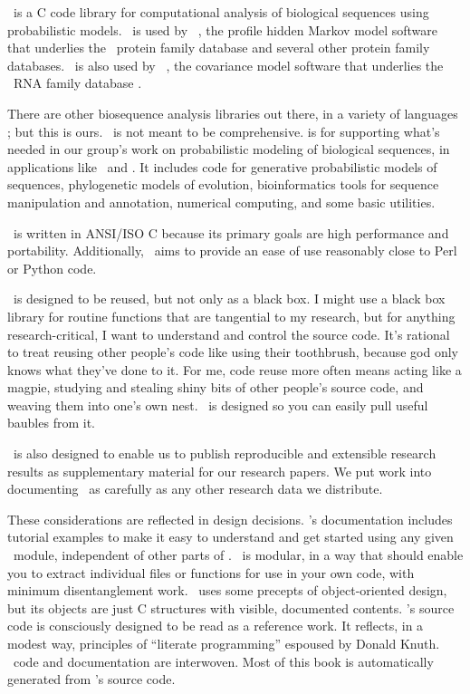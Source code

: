 

\Easel\ is a C code library for computational analysis of biological
sequences using probabilistic models. \Easel\ is used by \HMMER\ 
\citep{hmmer,Eddy98}, the profile hidden Markov model software that
underlies the \Pfam\ protein family database
\citep{Finn06,Sonnhammer97} and several other protein family
databases. \Easel\ is also used by \Infernal\ 
\citep{infernal,NawrockiEddy07}, the covariance model software that
underlies the \Rfam\ RNA family database
\citep{Griffiths-Jones05}. 

There are other biosequence analysis libraries out there, in a variety
of languages
\citep{Vahrson96,Pitt01,Mangalam02,Butt05,Dutheil06,Giancarlo07,Doring08};
but this is ours.  \Easel\ is not meant to be comprehensive.  \Easel
is for supporting what's needed in our group's work on probabilistic
modeling of biological sequences, in applications like \HMMER\ and
\Infernal. It includes code for generative probabilistic models of
sequences, phylogenetic models of evolution, bioinformatics tools for
sequence manipulation and annotation, numerical computing, and some
basic utilities.

\Easel\ is written in ANSI/ISO C because its primary goals are high
performance and portability. Additionally, \Easel\ aims to provide an
ease of use reasonably close to Perl or Python code.

\Easel\ is designed to be reused, but not only as a black box. I might
use a black box library for routine functions that are tangential to
my research, but for anything research-critical, I want to understand
and control the source code.  It's rational to treat reusing other
people's code like using their toothbrush, because god only knows what
they've done to it. For me, code reuse more often means acting like a
magpie, studying and stealing shiny bits of other people's source
code, and weaving them into one's own nest. \Easel\ is designed so you
can easily pull useful baubles from it.

\Easel\ is also designed to enable us to publish reproducible and
extensible research results as supplementary material for our research
papers. We put work into documenting \Easel\ as carefully as any other
research data we distribute.

These considerations are reflected in \Easel design decisions.
\Easel's documentation includes tutorial examples to make it easy to
understand and get started using any given \Easel\ module, independent
of other parts of \Easel.  \Easel\ is modular, in a way that should
enable you to extract individual files or functions for use in your
own code, with minimum disentanglement work. \Easel\ uses some
precepts of object-oriented design, but its objects are just C
structures with visible, documented contents. \Easel's source code is
consciously designed to be read as a reference work. It reflects, in a
modest way, principles of ``literate programming'' espoused by Donald
Knuth. \Easel\ code and documentation are interwoven. Most of this
book is automatically generated from \Easel's source code.



